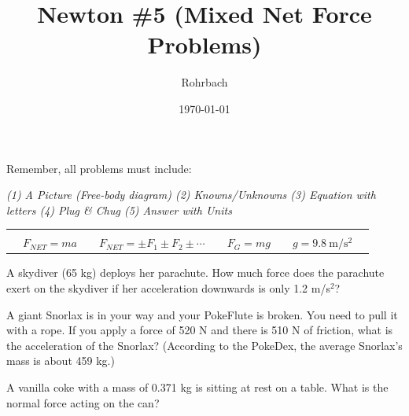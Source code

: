 \documentclass[10pt]{exam}
\title{Newton \#5 (Mixed Net Force Problems)}
\author{Rohrbach}
\date{\today}
\newcommand{\printeqs}{
  \begin{center}
    \begin{tabular}{|*9c|}
      \hline 
      &&&&&&&&\\
      &
      $F_{NET}=ma$ &&
      $F_{NET}=\pm F_1 \pm F_2 \pm \cdots$ &&
      $F_G=mg$ &&
      $g=\SI{9.8}{\meter\per\second^2}$ &
      \\
      \hline
    \end{tabular}
  \end{center}
}
\begin{document}
\maketitle

\noindent
Remember, all problems must include:

\begin{center}
  \it
   (1) A Picture (Free-body diagram) \hspace{3em}    
   (2) Knowns/Unknowns \hspace{3em}    
   (3) Equation with letters \hspace{3em}
   (4) Plug \& Chug  \hspace{5em}
   (5) Answer with Units
\end{center}

\printeqs

\begin{questions}
  
    \question
      A skydiver (65 kg) deploys her parachute.  How much force does the parachute exert on the skydiver if her acceleration downwards is only 1.2 m/s$^2$?
      \vs

    \question
      A giant Snorlax is in your way and your PokeFlute is broken.  You need to pull it with a rope.  If you apply a force of 520 N and there is 510 N of friction, what is the acceleration of the Snorlax?   (According to the PokeDex, the average Snorlax's mass is about 459 kg.)
      \vs

    \question
      A vanilla coke with a mass of 0.371 kg is sitting at rest on a table.  What is the normal force acting on the can?
      \vs

\end{questions}
\end{document}
